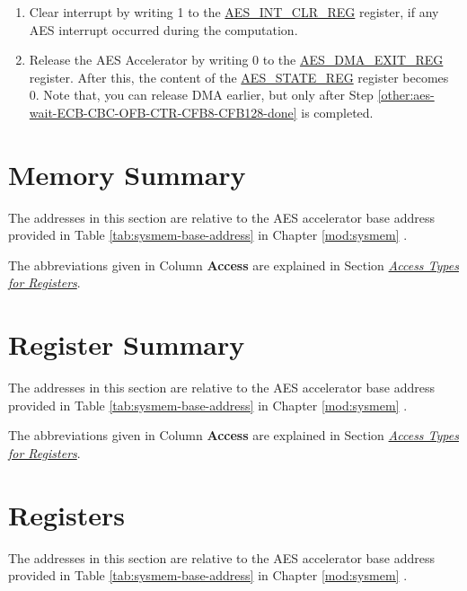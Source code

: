 \documentclass[main\_\_EN.tex]{subfiles}
\begin{document}
\begin{enumerate}
    \item Clear interrupt by writing 1 to the \hyperref[regdesc:AESINTCLRREG]{AES\_INT\_CLR\_REG} register, if any AES interrupt occurred during the computation.
    \item Release the AES Accelerator by writing 0 to the \hyperref[regdesc:AESDMAEXITREG]{AES\_DMA\_EXIT\_REG} register. After this, the content of the \hyperref[regdesc:AESSTATEREG]{AES\_STATE\_REG} register becomes 0.
    Note that, you can release DMA earlier, but only after Step \ref{other:aes-wait-ECB-CBC-OFB-CTR-CFB8-CFB128-done} is completed.
\end{enumerate}

\section{Memory Summary}\label{aesMemorySummary}

The addresses in this section are relative to the AES accelerator base address provided in Table \ref{tab:sysmem-base-address} in Chapter \ref{mod:sysmem} \textit{}.

The abbreviations given in Column \textbf{Access} are explained in Section \hyperref[glossary-access-types]{\textit{Access Types for Registers}}.




\clearpage
\section{Register Summary} \hypertarget{aes-reg-summ}{}
The addresses in this section are relative to the AES accelerator base address provided in Table \ref{tab:sysmem-base-address} in Chapter \ref{mod:sysmem} \textit{}.

The abbreviations given in Column \textbf{Access} are explained in Section \hyperref[glossary-access-types]{\textit{Access Types for Registers}}.



\clearpage
\section{Registers}
The addresses in this section are relative to the AES accelerator base address provided in Table \ref{tab:sysmem-base-address} in Chapter \ref{mod:sysmem} \textit{}.


\end{document}
